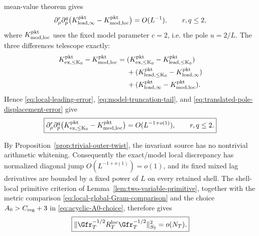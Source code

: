 mean-value theorem gives
\begin{equation}
\partial_\rho^r\partial_p^q
\bigl(K_{\rm lead,\infty}^{\rm pkt}-K_{\rm mod,loc}^{\rm pkt}\bigr)
=O(L^{-1}),
\qquad r,q\le2,
\label{eq:translated-pole-displacement-error}
\end{equation}
where $K_{\rm mod,loc}^{\rm pkt}$ uses the fixed model parameter $c=2$, i.e.
the pole $u=2/L$. The three differences telescope exactly:
\begin{align*}
K_{\rm ex,\le K_0}^{\rm pkt}-K_{\rm mod,loc}^{\rm pkt}
={}&(K_{\rm ex,\le K_0}^{\rm pkt}-K_{\rm lead,\le K_0}^{\rm pkt})\\
&+(K_{\rm lead,\le K_0}^{\rm pkt}-K_{\rm lead,\infty}^{\rm pkt})\\
&+(K_{\rm lead,\infty}^{\rm pkt}-K_{\rm mod,loc}^{\rm pkt}).
\end{align*}
Hence \eqref{eq:local-leading-error}, \eqref{eq:model-truncation-tail}, and
\eqref{eq:translated-pole-displacement-error} give
\begin{equation}
\boxed{
\partial_\rho^r\partial_p^q
\bigl(K_{\rm ex,\le K_0}^{\rm pkt}-K_{\rm mod,loc}^{\rm pkt}\bigr)
=O(L^{-1+o(1)}),
\qquad r,q\le2.
}
\label{eq:local-model-error}
\end{equation}

By Proposition~\ref{prop:trivial-outer-twist}, the invariant source has no
nontrivial arithmetic whitening. Consequently the exact/model local discrepancy
has normalized diagonal jump $O(L^{-1+o(1)})=o(1)$, and its fixed mixed lag
derivatives are bounded by a fixed power of $L$ on every retained shell.
The shell-local primitive criterion of Lemma~\ref{lem:two-variable-primitive},
together with the metric comparison
\eqref{eq:local-global-Gram-comparison} and the choice
$A_0>C_{\rm reg}+3$ in \eqref{eq:acyclic-A0-choice}, therefore gives
\begin{equation}
\boxed{
\|\Gfr_T^{-1/2}R_T^{\rm loc}\Gfr_T^{-1/2}\|_{S_2}^2=o(N_T).
}
\label{eq:local-HS}
\end{equation}

